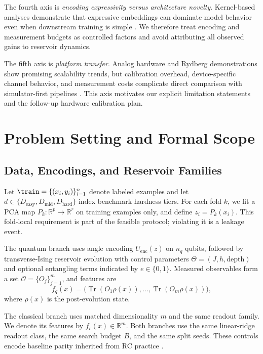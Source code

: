 \documentclass{article} %
\begin{document}
The fourth axis is \emph{encoding expressivity versus architecture novelty}. Kernel-based analyses demonstrate that expressive embeddings can dominate model behavior even when downstream training is simple \citep{arxiv_2101_11020,arxiv_2008_08605,arxiv_2502_06281}. We therefore treat encoding and measurement budgets as controlled factors and avoid attributing all observed gains to reservoir dynamics.

The fifth axis is \emph{platform transfer}. Analog hardware and Rydberg demonstrations show promising scalability trends, but calibration overhead, device-specific channel behavior, and measurement costs complicate direct comparison with simulator-first pipelines \citep{arxiv_2407_02553,arxiv_2310_06706,arxiv_2602_00610}. This axis motivates our explicit limitation statements and the follow-up hardware calibration plan.

\section{Problem Setting and Formal Scope}
\label{sec:problem}
\subsection{Data, Encodings, and Reservoir Families}
Let $\train=\{(x_i,y_i)\}_{i=1}^{n}$ denote labeled examples and let $d\in\{D_{\mathrm{easy}},D_{\mathrm{mid}},D_{\mathrm{hard}}\}$ index benchmark hardness tiers. For each fold $k$, we fit a PCA map $P_k:\mathbb{R}^{p}\to\mathbb{R}^{r}$ on training examples only, and define $z_i=P_k(x_i)$. This fold-local requirement is part of the feasible protocol; violating it is a leakage event.

The quantum branch uses angle encoding $U_{\mathrm{enc}}(z)$ on $n_q$ qubits, followed by transverse-Ising reservoir evolution with control parameters $\Theta=(J,h,\text{depth})$ and optional entangling terms indicated by $e\in\{0,1\}$. Measured observables form a set $\mathcal{O}=\{O_j\}_{j=1}^{m}$, and features are
\begin{equation}
\label{eq:q_feature}
f_q(x)=\big(\operatorname{Tr}(O_1\rho(x)),\ldots,\operatorname{Tr}(O_m\rho(x))\big),
\end{equation}
where $\rho(x)$ is the post-evolution state.

The classical branch uses matched dimensionality $m$ and the same readout family. We denote its features by $f_c(x)\in\mathbb{R}^{m}$. Both branches use the same linear-ridge readout class, the same search budget $B$, and the same split seeds. These controls encode baseline parity inherited from RC practice \citep{url_echo_state_2001,doi_10_1162_089976602760407955}.
\end{document}
